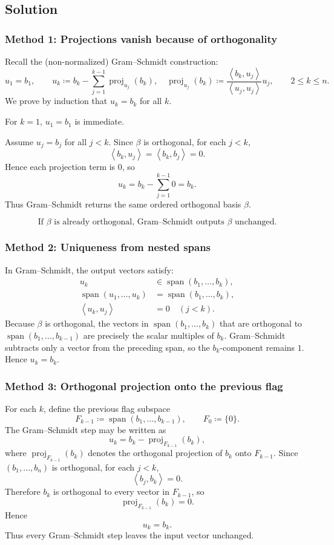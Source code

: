 \documentclass[12pt]{article}
\newcommand{\df}{\coloneqq}
\DeclareMathOperator{\Span}{span}
\DeclareMathOperator{\proj}{proj}
\newcommand{\ip}[2]{\left\langle #1,#2\right\rangle}
\begin{document}
\subsection{Solution}

\subsubsection{Method 1: Projections vanish because of orthogonality}
Recall the (non-normalized) Gram--Schmidt construction:
\[
u_1=b_1,\qquad
u_k \df b_k-\sum_{j=1}^{k-1}\proj_{u_j}(b_k),
\quad
\proj_{u_j}(b_k)\df \frac{\ip{b_k}{u_j}}{\ip{u_j}{u_j}}u_j,\qquad 2\le k\le n.
\]
We prove by induction that $u_k=b_k$ for all $k$.

For $k=1$, $u_1=b_1$ is immediate.

Assume $u_j=b_j$ for all $j<k$. Since $\beta$ is orthogonal, for each $j<k$,
\[
\ip{b_k}{u_j}=\ip{b_k}{b_j}=0.
\]
Hence each projection term is $0$, so
\[
u_k=b_k-\sum_{j=1}^{k-1} 0=b_k.
\]
Thus Gram--Schmidt returns the same ordered orthogonal basis $\beta$.

\[
\boxed{\,\text{If }\beta\text{ is already orthogonal, Gram--Schmidt outputs }\beta\text{ unchanged.}\,}
\]

\subsubsection{Method 2: Uniqueness from nested spans}
In Gram--Schmidt, the output vectors satisfy:
\[
\begin{aligned}
u_k&\in \Span(b_1,\dots,b_k),\\
\Span(u_1,\dots,u_k)&=\Span(b_1,\dots,b_k),\\
\ip{u_k}{u_j}&=0\quad (j<k).
\end{aligned}
\]
Because $\beta$ is orthogonal, the vectors in $\Span(b_1,\dots,b_k)$ that are
orthogonal to $\Span(b_1,\dots,b_{k-1})$ are precisely the scalar multiples of
$b_k$. Gram--Schmidt subtracts only a vector from the preceding span, so the
$b_k$-component remains $1$. Hence $u_k=b_k$.



\subsubsection{Method 3: Orthogonal projection onto the previous flag}
For each $k$, define the previous flag subspace
\[
F_{k-1}\df \Span(b_1,\dots,b_{k-1}),
\qquad F_0\df \{0\}.
\]
The Gram--Schmidt step may be written as
\[
u_k=b_k-\proj_{F_{k-1}}(b_k),
\]
where $\proj_{F_{k-1}}(b_k)$ denotes the orthogonal projection of $b_k$ onto $F_{k-1}$.
Since $(b_1,\dots,b_n)$ is orthogonal, for each $j<k$,
\[
\ip{b_j}{b_k}=0.
\]
Therefore $b_k$ is orthogonal to every vector in $F_{k-1}$, so
\[
\proj_{F_{k-1}}(b_k)=0.
\]
Hence
\[
u_k=b_k.
\]
Thus every Gram--Schmidt step leaves the input vector unchanged.
\end{document}
